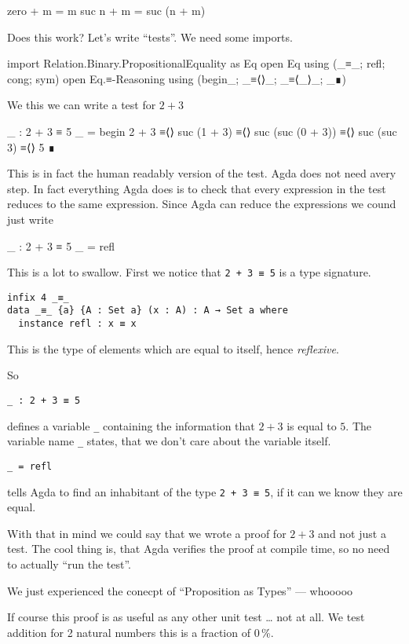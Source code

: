 \begin{code}
zero + m = m
suc n + m = suc (n + m)
\end{code}

Does this work? Let's write “tests”. We need some imports.
\begin{code}
import Relation.Binary.PropositionalEquality as Eq
open Eq using (_≡_; refl; cong; sym)
open Eq.≡-Reasoning using (begin_; _≡⟨⟩_; _≡⟨_⟩_; _∎)
\end{code}

We this we can write a test for $2 + 3$
\begin{code}
_ : 2 + 3 ≡ 5
_ =
  begin
    2 + 3
  ≡⟨⟩
    suc (1 + 3)
  ≡⟨⟩
    suc (suc (0 + 3))
  ≡⟨⟩
    suc (suc 3)
  ≡⟨⟩
    5
  ∎
\end{code}
This is in fact the human readably version of the test. Agda does not need
avery step. In fact everything Agda does is to check that every expression
in the test reduces to the same expression. Since Agda can reduce the expressions
we cound just write
\begin{code}
_ : 2 + 3 ≡ 5
_ = refl
\end{code}

This is a lot to swallow. First we notice that \verb=2 + 3 ≡ 5= is a type signature.

\begin{verbatim}
infix 4 _≡_
data _≡_ {a} {A : Set a} (x : A) : A → Set a where
  instance refl : x ≡ x
\end{verbatim}
This is the type of elements which are equal to itself, hence \emph{reflexive}.

So
\begin{verbatim}
_ : 2 + 3 ≡ 5
\end{verbatim}
defines a variable \verb+_+ containing the information that $2+3$ is equal to $5$.
The variable name \verb+_+ states, that we don't care about the variable itself.

\begin{verbatim}
_ = refl
\end{verbatim}
tells Agda to find an inhabitant of the type \verb=2 + 3 ≡ 5=, if it can
we know they are equal.

With that in mind we could say that we wrote a proof for $2+3$ and not just a test.
The cool thing is, that Agda verifies the proof at compile time, so no need to
actually “run the test”.

We just experienced the conecpt of “Proposition as Types” — whooooo

If course this proof is as useful as any other unit test … not at all.
We test addition for 2 natural numbers this is a fraction of 0\,\%.

